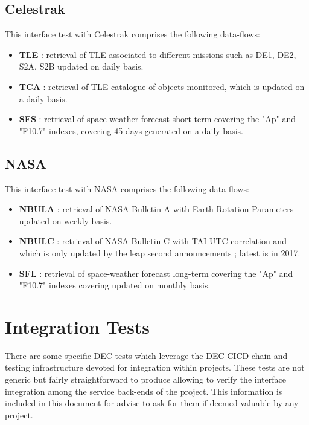 \documentclass[dec_sum_main.tex]{subfiles}
\begin{document}
\subsection{Celestrak}
This interface test with Celestrak comprises the following data-flows:
\begin{itemize}
    \item \textbf{TLE} : retrieval of TLE associated to different missions such as DE1, DE2, S2A, S2B updated on daily basis.
    \item \textbf{TCA} : retrieval of TLE catalogue of objects monitored, which is updated on a daily basis.
    \item \textbf{SFS} : retrieval of space-weather forecast short-term covering the "Ap" and "F10.7" indexes, covering 45 days generated on a daily basis.
\end{itemize}

\subsection{NASA}
This interface test with NASA comprises the following data-flows:
\begin{itemize}
    \item \textbf{NBULA} : retrieval of NASA Bulletin A with Earth Rotation Parameters updated on weekly basis.
    \item \textbf{NBULC} : retrieval of NASA Bulletin C with TAI-UTC correlation and which is only updated by the leap second announcements ; latest is in 2017.
    \item \textbf{SFL} : retrieval of space-weather forecast long-term covering the "Ap" and "F10.7" indexes covering updated on monthly basis.
\end{itemize}


\section{Integration Tests}
There are some specific DEC tests which leverage the DEC CICD chain and testing infrastructure devoted for integration within projects. These tests are not generic but fairly straightforward to produce allowing to verify the interface integration among the service back-ends of the project. This information is included in this document for advise to ask for them if deemed valuable by any project.
\end{document}

